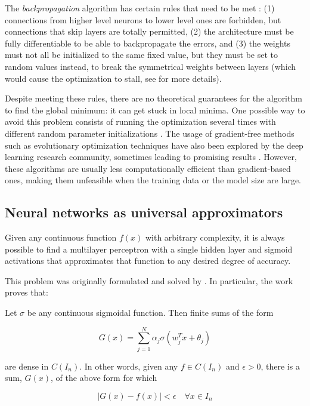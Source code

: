 The \textit{backpropagation} algorithm has certain rules that need to be met \autocite{hinton1986}: (1) connections from higher level neurons to lower level ones are forbidden, but connections that skip layers are totally permitted, (2) the architecture must be fully differentiable to be able to backpropagate the errors, and (3) the weights must not all be initialized to the same fixed value, but they must be set to random values instead, to break the symmetrical weights between layers (which would cause the optimization to stall, see \autocite{hinton1986} for more details). 


Despite meeting these rules, there are no theoretical guarantees for the algorithm to find the global minimum: it can get stuck in local minima. One possible way to avoid this problem consists of running the optimization several times with different random parameter initializations \autocite{haykin1998}. The usage of gradient-free methods such as evolutionary optimization techniques \autocite{sivanandam2008} have also been explored by the deep learning research community, sometimes leading to promising results \autocite{omid2014, vallesperez2012}. However, these algorithms are usually less computationally efficient than gradient-based ones, making them unfeasible when the training data or the model size are large.

\subsection{Neural networks as universal approximators}
Given any continuous function $f(x)$ with arbitrary complexity, it is always possible to find a multilayer perceptron with a single hidden layer and sigmoid activations that approximates that function to any desired degree of accuracy.

This problem was originally formulated and solved by \citealp{Cybenko1989}. In particular, the work proves that:

\begin{thm}[2 - Cybenko, 1989]
	Let $\sigma$ be any continuous sigmoidal function. Then finite sums of the form

	$$ G(x) = \sum_{j=1}^{N} \alpha_j \sigma(w_j^Tx + \theta_j) $$

	are dense in $C(I_n)$. In other words, given any $f \in C(I_n)$ and $\epsilon > 0$, there is a sum, $G(x)$, of the above form for which

	$$|G(x) - f(x)| < \epsilon \quad \forall x \in I_n$$
\end{thm}

